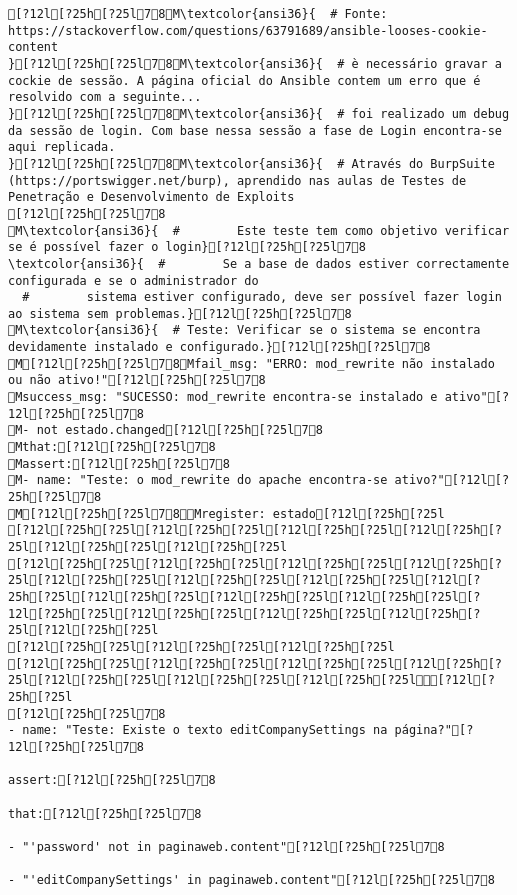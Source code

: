 \documentclass{scrartcl}
\begin{document}
\begin{Verbatim}
[?12l[?25h[?25l78M\textcolor{ansi36}{  # Fonte: https://stackoverflow.com/questions/63791689/ansible-looses-cookie-content
}[?12l[?25h[?25l78M\textcolor{ansi36}{  # è necessário gravar a cockie de sessão. A página oficial do Ansible contem um erro que é resolvido com a seguinte...
}[?12l[?25h[?25l78M\textcolor{ansi36}{  # foi realizado um debug da sessão de login. Com base nessa sessão a fase de Login encontra-se aqui replicada.
}[?12l[?25h[?25l78M\textcolor{ansi36}{  # Através do BurpSuite (https://portswigger.net/burp), aprendido nas aulas de Testes de Penetração e Desenvolvimento de Exploits
[?12l[?25h[?25l78
M\textcolor{ansi36}{  #        Este teste tem como objetivo verificar se é possível fazer o login}[?12l[?25h[?25l78
\textcolor{ansi36}{  #        Se a base de dados estiver correctamente configurada e se o administrador do
  #        sistema estiver configurado, deve ser possível fazer login ao sistema sem problemas.}[?12l[?25h[?25l78
M\textcolor{ansi36}{  # Teste: Verificar se o sistema se encontra devidamente instalado e configurado.}[?12l[?25h[?25l78
M[?12l[?25h[?25l78Mfail_msg: "ERRO: mod_rewrite não instalado ou não ativo!"[?12l[?25h[?25l78
Msuccess_msg: "SUCESSO: mod_rewrite encontra-se instalado e ativo"[?12l[?25h[?25l78
M- not estado.changed[?12l[?25h[?25l78
Mthat:[?12l[?25h[?25l78
Massert:[?12l[?25h[?25l78
M- name: "Teste: o mod_rewrite do apache encontra-se ativo?"[?12l[?25h[?25l78
M[?12l[?25h[?25l78Mregister: estado[?12l[?25h[?25l
[?12l[?25h[?25l[?12l[?25h[?25l[?12l[?25h[?25l[?12l[?25h[?25l[?12l[?25h[?25l[?12l[?25h[?25l
[?12l[?25h[?25l[?12l[?25h[?25l[?12l[?25h[?25l[?12l[?25h[?25l[?12l[?25h[?25l[?12l[?25h[?25l[?12l[?25h[?25l[?12l[?25h[?25l[?12l[?25h[?25l[?12l[?25h[?25l[?12l[?25h[?25l[?12l[?25h[?25l[?12l[?25h[?25l[?12l[?25h[?25l[?12l[?25h[?25l[?12l[?25h[?25l
[?12l[?25h[?25l[?12l[?25h[?25l[?12l[?25h[?25l
[?12l[?25h[?25l[?12l[?25h[?25l[?12l[?25h[?25l[?12l[?25h[?25l[?12l[?25h[?25l[?12l[?25h[?25l[?12l[?25h[?25l[?12l[?25h[?25l
[?12l[?25h[?25l78
- name: "Teste: Existe o texto editCompanySettings na página?"[?12l[?25h[?25l78

assert:[?12l[?25h[?25l78

that:[?12l[?25h[?25l78

- "'password' not in paginaweb.content"[?12l[?25h[?25l78

- "'editCompanySettings' in paginaweb.content"[?12l[?25h[?25l78


\end{Verbatim}
\end{document}
